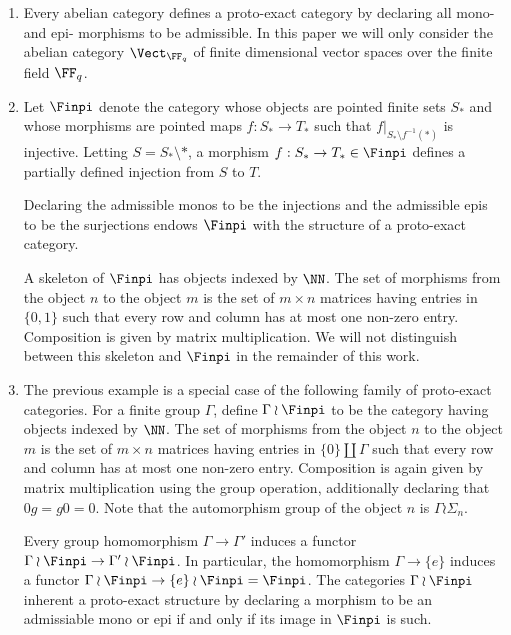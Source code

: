 \begin{Example}
\begin{enumerate}
 \item Every abelian category defines a proto-exact category by declaring all mono- and epi- morphisms to be admissible. In this paper we will only consider the abelian category $\Vect_{\FF_q}$ of finite dimensional vector spaces over the finite field $\FF_q$.
 
 \item Let $\Finpi$ denote the category whose objects are pointed finite sets $S_*$ and whose morphisms are pointed maps $f: S_* \to T_* $ such that $f|_{S_* \setminus f^{-1}(*)}$ is injective. Letting $S = S_* \setminus *$, a morphism $f:S_* \to T_* \in \Finpi$ defines a partially defined injection from $S$ to $T$. 
 
 Declaring the admissible monos to be the injections and the admissible epis to be the surjections endows $\Finpi$ with the structure of a proto-exact category. 

A skeleton of $\Finpi$ has objects indexed by $\NN$. The set of morphisms from the object $n$ to the object $m$ is the set of $m\times n$ matrices having entries in $\{0,1\}$ such that every row and column has at most one non-zero entry. Composition is given by matrix multiplication.  We will not distinguish between this skeleton and $\Finpi$ in the remainder of this work.

\item The previous example is a special case of the following family of proto-exact categories. For a finite group $\Gamma$, define $\Gamma \wr \Finpi $ to be the category having objects indexed by $\NN$. The set of morphisms from the object $n$ to the object $m$ is the set of $m \times n$ matrices having entries in $\{0\} \coprod \Gamma$ such that every row and column has at most one non-zero entry. Composition is again given by matrix multiplication using the group operation, additionally declaring that $0 g = g 0 = 0$. Note that the automorphism group of the object $n$ is $\Gamma \wr \Sigma_n$.

Every group homomorphism $\Gamma \to \Gamma'$ induces a functor $\Gamma \wr \Finpi \to \Gamma' \wr \Finpi$. In particular, the homomorphism $\Gamma \to \{e\}$ induces a functor $\Gamma \wr \Finpi \to \{e\} \wr \Finpi = \Finpi$. The categories $\Gamma \wr \Finpi$ inherent a proto-exact structure by declaring a morphism to be an admissiable mono or epi if and only if its image in $\Finpi$ is such.
\end{enumerate}
\end{Example}



